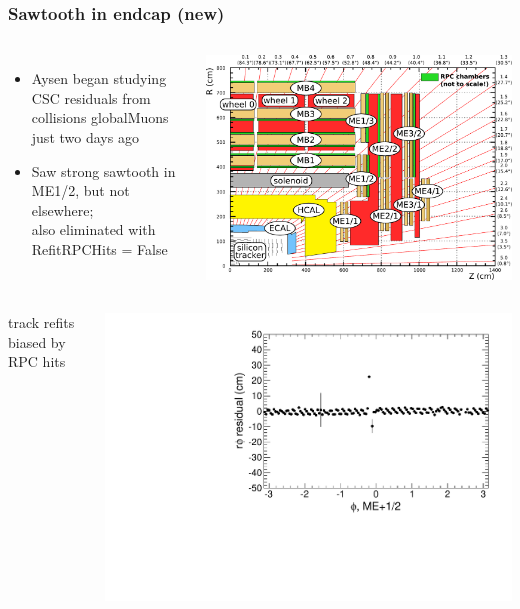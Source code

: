 \documentclass[compress]{beamer}
\begin{document}
\begin{frame}
\frametitle{Sawtooth in endcap (new)}

\vspace{-0.25 cm}
\begin{columns}
\begin{itemize}
\item Aysen began studying CSC residuals from collisions globalMuons just two days ago
\item Saw strong sawtooth in ME1/2, but not elsewhere; \\ also eliminated with 
RefitRPCHits = False
\end{itemize}

\includegraphics[width=\linewidth]{muon_system_withRPC.pdf}
\end{columns}

\vspace{0.25 cm}
\begin{columns}
track refits biased by RPC hits

\includegraphics[width=\linewidth]{deltax_phi_prof_mep12_refitRPC.pdf}


\end{columns}
\end{frame}
\end{document}
